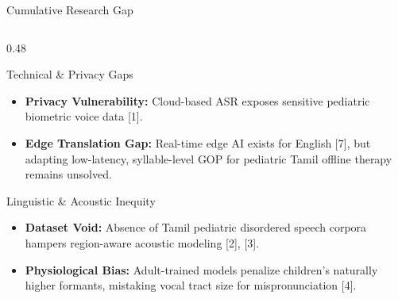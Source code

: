 \documentclass[aspectratio=169, 11pt, xcolor=table]{beamer}
\begin{document}
\begin{frame}{Cumulative Research Gap}
    \vspace{-5mm}
    \begin{columns}[T, totalwidth=\textwidth]

        \begin{column}{0.48\textwidth}
            \begin{block}{Technical \& Privacy Gaps}
                \tiny
                \begin{itemize}
                    \setlength{\itemsep}{2pt}
                    \item \textbf{Privacy Vulnerability:} Cloud-based ASR exposes sensitive pediatric biometric voice data [1].
                    \item \textbf{Edge Translation Gap:} Real-time edge AI exists for English [7], but adapting low-latency, syllable-level GOP for pediatric Tamil offline therapy remains unsolved.
                \end{itemize}
            \end{block}

            \vspace{1mm}

            \begin{block}{Linguistic \& Acoustic Inequity}
                \tiny
                \begin{itemize}
                    \setlength{\itemsep}{2pt}
                    \item \textbf{Dataset Void:} Absence of Tamil pediatric disordered speech corpora hampers region-aware acoustic modeling [2], [3].
                    \item \textbf{Physiological Bias:} Adult-trained models penalize children's naturally higher formants, mistaking vocal tract size for mispronunciation [4].
                \end{itemize}
            \end{block}
        \end{column}


\end{columns}
\end{frame}
\end{document}
